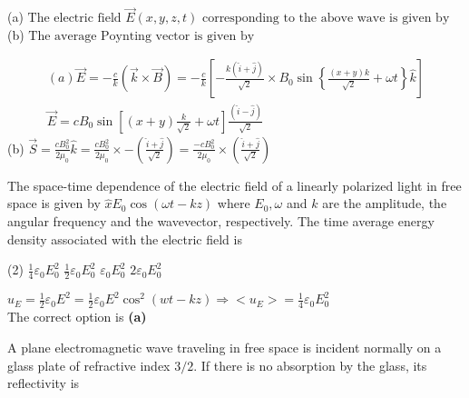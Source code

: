 \begin{enumerate}
\begin{minipage}{\textwidth}
		(a)$\text { The electric field } \vec{E}(x, y, z, t) \text { corresponding to the above wave is given by }$\\
		(b)$\text { The average Poynting vector is given by }$
	\end{minipage}
	\begin{answer}
		$$\begin{gathered} 
		(a) \vec{E}=-\frac{c}{k}(\vec{k} \times \vec{B})=-\frac{c}{k}\left[-\frac{k(\hat{i}+\hat{j})}{\sqrt{2}} \times B_{0} \sin \left\{\frac{(x+y) k}{\sqrt{2}}+\omega t\right\} \hat{k}\right] \\
		\vec{E}=c B_{0} \sin \left[(x+y) \frac{k}{\sqrt{2}}+\omega t\right] \frac{(\hat{i}-\hat{j})}{\sqrt{2}}
		\end{gathered}$$
		(b)
		$ \vec{S}=\frac{c B_{0}^{2}}{2 \mu_{0}} \hat{k}=\frac{c B_{0}^{2}}{2 \mu_{0}} \times-\left(\frac{\hat{i}+\hat{j}}{\sqrt{2}}\right)=\frac{-c B_{0}^{2}}{2 \mu_{0}} \times\left(\frac{\hat{i}+\hat{j}}{\sqrt{2}}\right)$	
	\end{answer}
	\begin{minipage}{\textwidth}
		\item The space-time dependence of the electric field of a linearly polarized light in free space is given by $\hat{x} E_{0} \cos (\omega t-k z)$ where $E_{0}, \omega$ and $k$ are the amplitude, the angular frequency and the wavevector, respectively. The time average energy density associated with the electric field is
	\end{minipage}
	\begin{tasks}(2)
		\task[\textbf{A.}] $\frac{1}{4} \varepsilon_{0} E_{0}^{2}$
		\task[\textbf{B.}]$\frac{1}{2} \varepsilon_{0} E_{0}^{2}$
		\task[\textbf{C.}]$\varepsilon_{0} E_{0}^{2}$
		\task[\textbf{D.}]$2 \varepsilon_{0} E_{0}^{2}$
	\end{tasks}
	\begin{answer}
		$u_{E}=\frac{1}{2} \varepsilon_{0} E^{2}=\frac{1}{2} \varepsilon_{0} E^{2} \cos ^{2}(w t-k z) \Rightarrow<u_{E}>=\frac{1}{4} \varepsilon_{0} E_{0}^{2}$\\
		The correct option is \textbf{(a)}	
	\end{answer}
	\begin{minipage}{\textwidth}
		\item A plane electromagnetic wave traveling in free space is incident normally on a glass plate of refractive index $3 / 2 .$ If there is no absorption by the glass, its reflectivity is
	\end{minipage}

\end{enumerate}
